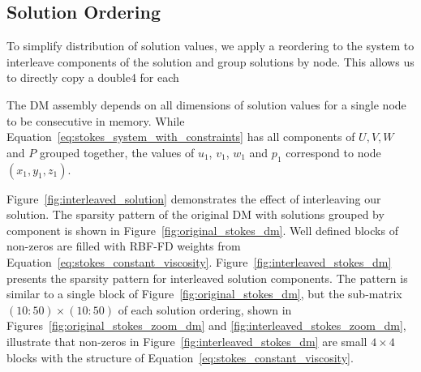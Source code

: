 \subsection{Solution Ordering}

To simplify distribution of solution values, we apply a reordering to the system to interleave components of the solution and group solutions by node. This allows us to directly copy a double4 for each 

The DM assembly depends on all dimensions of solution values for a single node to be consecutive in memory. While Equation~\ref{eq:stokes_system_with_constraints} has all components of $U, V, W$ and $P$ grouped together, the values of $u_1$, $v_1$, $w_1$ and $p_1$ correspond to node $(x_1, y_1, z_1)$. 

Figure~\ref{fig:interleaved_solution} demonstrates the effect of interleaving our solution. The sparsity pattern of the original DM with solutions grouped by component is shown in Figure~\ref{fig:original_stokes_dm}. Well defined blocks of non-zeros are filled with RBF-FD weights from Equation~\ref{eq:stokes_constant_viscosity}. Figure~\ref{fig:interleaved_stokes_dm} presents the sparsity pattern for interleaved solution components. The pattern is similar to a single block of Figure~\ref{fig:original_stokes_dm}, but the sub-matrix $(10:50)\times(10:50)$ of each solution ordering, shown in Figures~\ref{fig:original_stokes_zoom_dm} and \ref{fig:interleaved_stokes_zoom_dm}, illustrate that non-zeros in Figure~\ref{fig:interleaved_stokes_dm} are small $4\times4$ blocks with the structure of Equation~\ref{eq:stokes_constant_viscosity}.

